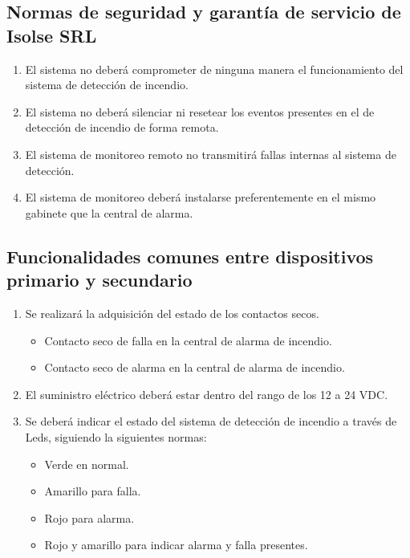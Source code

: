 \subsection{Normas de seguridad y garantía de servicio de Isolse SRL}
	\begin{enumerate}
	\item El sistema no deberá comprometer de ninguna manera el funcionamiento del sistema de detección de incendio.
	\item El sistema no deberá silenciar ni resetear los eventos presentes en el de detección de incendio de forma remota. 
	\item El sistema de monitoreo remoto no transmitirá fallas internas al sistema de detección.
	\item El sistema de monitoreo deberá instalarse preferentemente en el mismo gabinete que la central de alarma.
	\end{enumerate}
	
\subsection{Funcionalidades comunes entre dispositivos primario y secundario}
	\begin{enumerate}
	\item Se realizará la adquisición del estado de los contactos secos.
		\begin{itemize}
		\item Contacto seco de falla en la central de alarma de incendio.
		\item Contacto seco de alarma en la central de alarma de incendio.
		\end{itemize}
	\item El suministro eléctrico deberá estar dentro del rango de los 12 a 24 VDC.
	\item Se deberá indicar el estado del sistema de detección de incendio a través de Leds, siguiendo la siguientes normas:
		\begin{itemize}
		\item  Verde en normal.
		\item  Amarillo para falla.
		\item  Rojo para alarma.
		\item   Rojo y amarillo para indicar alarma y falla presentes.				
		\end{itemize}
	\end{enumerate}
	
